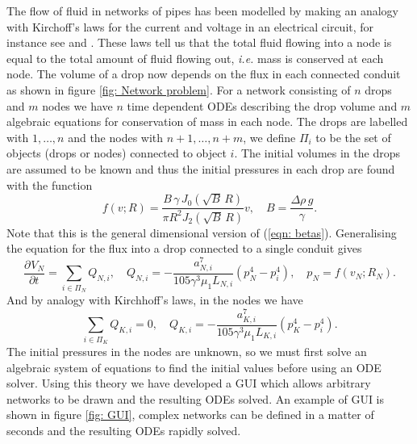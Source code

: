 \documentclass{jfm}
\newcommand{\pD}[3]{\frac{ \partial^{#3} {#1} }{ \partial {#2}^{#3} }}
\newcommand{\besselj}[2]{J_{#1}\!\left(#2\right)}
\begin{document}
 The flow of fluid in networks of pipes  has been modelled 
 by making an analogy with Kirchoff's  laws for the current and voltage in an electrical circuit, for instance see  \cite{WilliJagerBenSchweizerViscousPipes} and 
 \cite{Marusic-Paloka2001FluidPipes}.
 These laws  tell us that the total fluid flowing into a node is equal to the total amount of fluid flowing out,  {\it {i.e.}\ignorespaces} mass is conserved at each node.
The volume of a drop now depends on the flux in each connected conduit as  shown in  figure  \ref{fig: Network problem}.
For a network consisting of $n$ drops and $m$ nodes we have $n$ time dependent  ODEs  describing the drop volume and $m$ algebraic equations for conservation of mass in each node. 
The drops are labelled with    $1, \dots, n$ and the nodes  with $ n+1, \dots, n+m$, we define $ \Pi_i$ to be the set of objects (drops or nodes) connected to object $i$.
The initial volumes in the drops are assumed to be known and thus the initial pressures in each drop  are found with the function 
\begin{equation}
    f\!(v;R)  =  \frac{B\, \gamma\,  \besselj{0}{\sqrt{B}\, R }  }{\pi R^2  \besselj{2}{\sqrt{B}\, R } } v , \quad B = \frac{\Delta \rho\, g}{\gamma} .
\end{equation}
Note that this is the general dimensional version of (\ref{eqn: betas}).
Generalising the equation for the flux into a drop connected to a single conduit gives
\begin{equation} 
     \pD{V_N}{t}{}  = \sum_{i\in\Pi_N} Q_{N,i},\quad Q_{N,i} = -\frac{a_{N,i}^7}{105 \gamma^3 \mu_1 L_{N,i}}\left( p_N^4 -  p_{i}^4  \right), \quad   p_N =  f( v_N; R_N).
\end{equation}
And by analogy with Kirchhoff's laws, in the nodes we have 
\begin{equation} 
     \sum_{i\in\Pi_K} Q_{K,i}=0, \quad Q_{K,i} = -\frac{a_{K,i}^7}{105 \gamma^3 \mu_1 L_{K,i}}\left( p_K^4 -  p_{i}^4  \right).
\end{equation}
The initial pressures in the nodes are unknown, so we must first solve an  algebraic system  of equations to find the initial values before using an ODE solver.
 Using this theory we have developed a GUI which allows arbitrary networks to be drawn and the resulting ODEs solved. 
 An example of GUI is shown in figure \ref{fig: GUI}, complex networks can be defined in a matter of seconds and the resulting ODEs rapidly solved.
\end{document}
